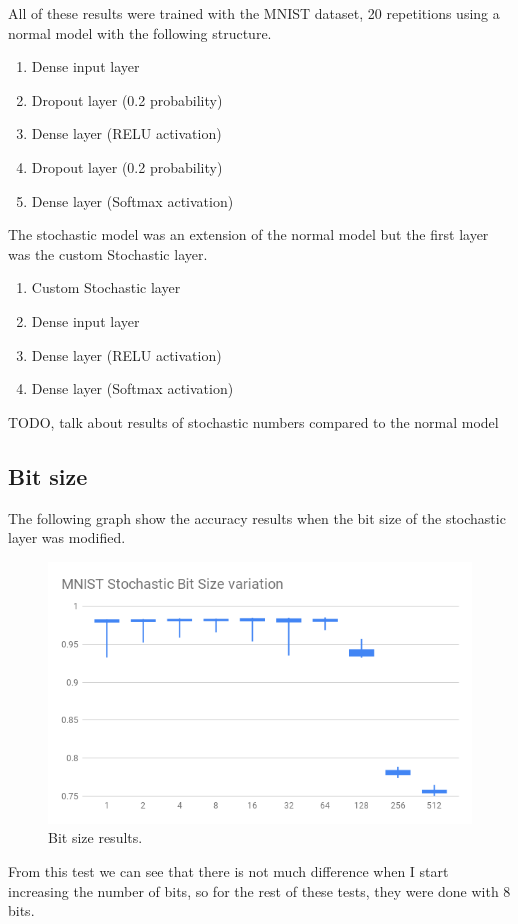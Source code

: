 \documentclass[a4paper,oneside,phd,etd]{BYUPhys}
\begin{document}
All of these results were trained with the MNIST dataset, 20 repetitions using a normal model with the following structure.
\begin{enumerate}
    \item Dense input layer
    \item Dropout layer (0.2 probability)
    \item Dense layer (RELU activation)
    \item Dropout layer (0.2 probability)
    \item Dense layer (Softmax activation)
\end{enumerate}
The stochastic model was an extension of the normal model but the first layer was the custom Stochastic layer.
\begin{enumerate}
    \item Custom Stochastic layer
    \item Dense input layer
    \item Dense layer (RELU activation)
    \item Dense layer (Softmax activation)
\end{enumerate}

TODO, talk about results of stochastic numbers compared to the normal model

\subsection{Bit size}
The following graph show the accuracy results when the bit size of the stochastic layer was modified.
\begin{figure}[H]
\centering
\includegraphics[width=16cm]{results/bitsize.png}
\caption{Bit size results.}
\label{fig:bitsize}
\end{figure}
From this test we can see that there is not much difference when I start increasing the number of bits, so for the rest of these tests, they were done with 8 bits.
\end{document}

